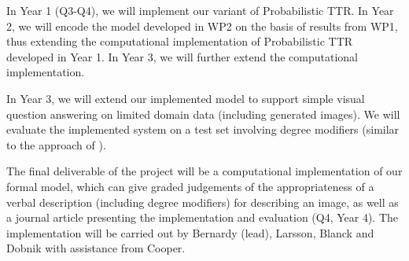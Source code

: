 \documentclass[11pt,a4paper]{article}
\newcommand{\comment}[1]{{\footnotesize\textsc{#1}}}
\begin{document}
In Year 1 (Q3-Q4), we will implement   our variant of Probabilistic TTR. In Year 2, we will encode the model developed in WP2 on the basis of results from WP1, thus extending the computational implementation of Probabilistic TTR developed in Year 1. In Year 3, we will further extend the computational implementation.

In Year 3, we will extend our implemented model to support simple visual question answering on limited domain data (including generated images). We will evaluate the implemented system on a test set involving degree modifiers (similar to the approach of \cite{andreas2016learning}).


The final deliverable of the project will be a computational implementation of our formal model, which can give graded judgements of the appropriateness of a verbal description (including degree modifiers) for describing an image, as well as a journal article presenting the implementation and evaluation (Q4, Year 4). The implementation will be carried out by Bernardy (lead), Larsson, Blanck and Dobnik  with assistance from Cooper.




\end{document}
